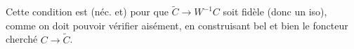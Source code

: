 
Cette condition est (néc. et)  pour que $\widetilde C\longrightarrow W^{-1}C$ soit fidèle (donc un iso), comme on doit pouvoir vérifier aisément, en construisant bel et bien le foncteur cherché $C\longrightarrow\widetilde C$.

